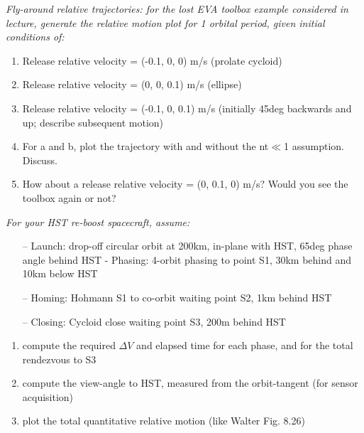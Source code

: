 \documentclass[onecolumn,10pt]{jhwhw}
\begin{document}
\clearpage

\problem{}
\textit{Fly-around relative trajectories: for the lost EVA toolbox example considered in lecture, generate the relative motion plot for 1 orbital period, given initial conditions of:}
\begin{enumerate}
\itemsep0em
\item Release relative velocity = (-0.1, 0, 0) m/s (prolate cycloid)
\item Release relative velocity = (0, 0, 0.1) m/s (ellipse)
\item Release relative velocity = (-0.1, 0, 0.1) m/s (initially 45deg backwards and up; describe subsequent motion)
\item For a and b, plot the trajectory with and without the nt$\ll$1 assumption. Discuss.
\item How about a release relative velocity = (0, 0.1, 0) m/s? Would you see the toolbox again or not?
\end{enumerate}
\clearpage

\problem{}
\textit{For your HST re-boost spacecraft, assume:}
\begin{itemize}
\itemsep0em
\item[--] Launch: drop-off circular orbit at 200km, in-plane with HST, 65deg phase angle behind HST - Phasing: 4-orbit phasing to point S1, 30km behind and 10km below HST
\item[--] Homing: Hohmann S1 to co-orbit waiting point S2, 1km behind HST
\item[--] Closing: Cycloid close waiting point S3, 200m behind HST
\end{itemize}
\begin{enumerate}
\itemsep0em
\item compute the required $\Delta V$ and elapsed time for each phase, and for the total rendezvous to S3
\item compute the view-angle to HST, measured from the orbit-tangent (for sensor acquisition)
\item plot the total quantitative relative motion (like Walter Fig. 8.26)
\end{enumerate}
\end{document}
